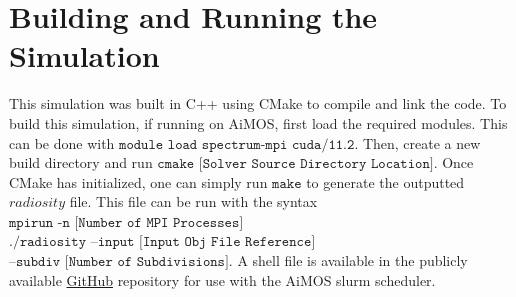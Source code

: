\documentclass[conference]{IEEEtran}
\begin{document}
\section{Building and Running the Simulation}
This simulation was built in C++ using CMake to compile and link the code. To build this simulation, if running on AiMOS, first load the required modules. This can be done with 
$\texttt{module load spectrum-mpi cuda/11.2}$. Then, create a new build directory and run $\texttt{cmake [Solver Source Directory Location]}$. Once CMake has initialized, one can simply run $\texttt{make}$ to generate the outputted $radiosity$ file. This file can be run with the syntax $\texttt{mpirun -n [Number of MPI Processes]}$ $\texttt{./radiosity --input [Input Obj File Reference]}$ $\texttt{--subdiv [Number of Subdivisions]}$. A shell file is available in the publicly available \href{https://github.com/eleanormally/parallel-radiosity}{GitHub} repository for use with the AiMOS slurm scheduler.
\end{document}
